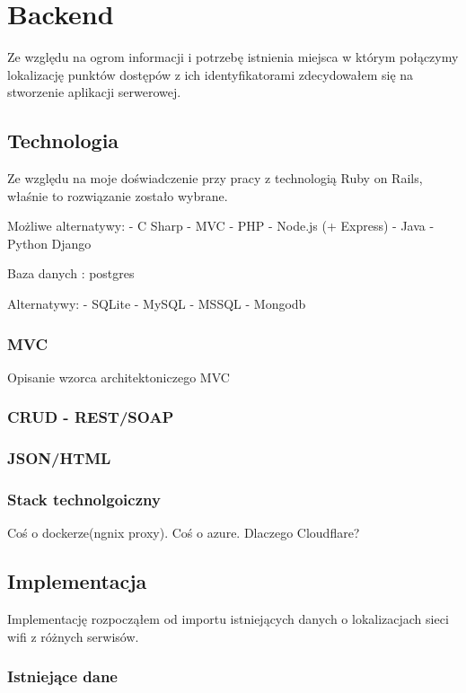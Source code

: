 \chapter{Backend}

Ze względu na ogrom informacji i potrzebę istnienia miejsca w którym połączymy lokalizację punktów dostępów z ich identyfikatorami zdecydowałem się na stworzenie aplikacji serwerowej. 

\section{Technologia}

Ze względu na moje doświadczenie przy pracy z technologią Ruby on Rails, właśnie to rozwiązanie zostało wybrane.

Możliwe alternatywy:
 - C Sharp - MVC
 - PHP
 - Node.js (+ Express)
 - Java
 - Python Django

Baza danych : postgres

Alternatywy:
 - SQLite
 - MySQL
 - MSSQL
 - Mongodb
 
 
\subsection{MVC}
Opisanie wzorca architektoniczego MVC

\subsection{CRUD - REST/SOAP}

\subsection{JSON/HTML}


\subsection{Stack technolgoiczny}
Coś o dockerze(ngnix proxy). Coś o azure. Dlaczego Cloudflare?



\section{Implementacja}

Implementację rozpocząłem od importu istniejących danych o lokalizacjach sieci wifi z różnych serwisów.

\subsection{Istniejące dane}

